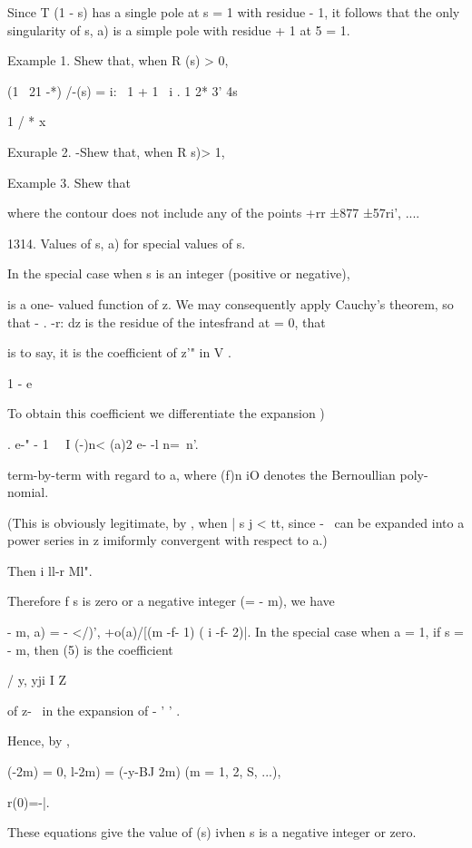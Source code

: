 Since T (1 - s) has a single pole at s = 1 with residue - 1, it
follows that the only singularity of s, a) is a simple pole with
residue + 1 at 5 = 1.

Example 1. Shew that, when R (s) > 0,

(1 \ 21 -*) /-(s) = i: \ 1 + 1 \ i . 1 2* 3' 4s ~

1 / * x ~

Exuraple 2. -Shew that, when R s)> 1,

Example 3. Shew that

where the contour does not include any of the points +rr ±877 ±57ri',
....

1314. Values of s, a) for special values of s.

In the special case when s is an integer (positive or negative),

is a one- valued function of z. We may consequently apply Cauchy's
theorem, so that - . -r: dz is the residue of the intesfrand at = 0,
that

is to say, it is the coefficient of z'" in V .

1 - e~

To obtain this coefficient we differentiate the expansion )

. e-" - 1 \ \ I (-)n< (a)2 e- -l n=\ n'.

term-by-term with regard to a, where (f)n iO denotes the Bernoullian
poly- nomial.

(This is obviously legitimate, by , when | s j < tt, since - \,
can be expanded into a power series in z imiformly convergent with
respect to a.)

Then i ll-r Ml".

Therefore f s is zero or a negative integer (= - m), we have

  - m, a) = - </)', +o(a)/[(m -f- 1) ( i -f- 2)|. In the special case
when a = 1, if s = - m, then (5) is the coefficient

/ y, yji I Z

of z-~ in the expansion of - ' ' .

%
%

Hence, by ,

 (-2m) = 0, l-2m) = (-y-BJ 2m) (m = 1, 2, S, ...),

r(0)=-|.

These equations give the value of (s) ivhen s is a negative integer or
zero.


